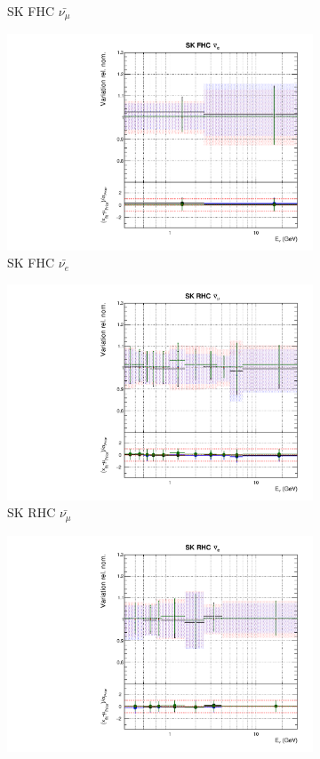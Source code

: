 \begin{figure}[t]
\begin{subfigure}{0.24\textwidth}
  \caption{SK FHC $\bar{\nu_{\mu}}$}
\end{subfigure}
\begin{subfigure}{0.24\textwidth}
  \centering
  \includegraphics[width=0.95\linewidth]{figs/hptpcfitsflux_11}
  \caption{SK FHC $\bar{\nu_e}$}
\end{subfigure}
\begin{subfigure}{0.24\textwidth}
  \centering
  \includegraphics[width=0.95\linewidth]{figs/hptpcfitsflux_12}
  \caption{SK RHC $\bar{\nu_{\mu}}$}
\end{subfigure}
\begin{subfigure}{0.24\textwidth}
  \centering
  \includegraphics[width=0.95\linewidth]{figs/hptpcfitsflux_13}

\end{subfigure}
\end{figure}
